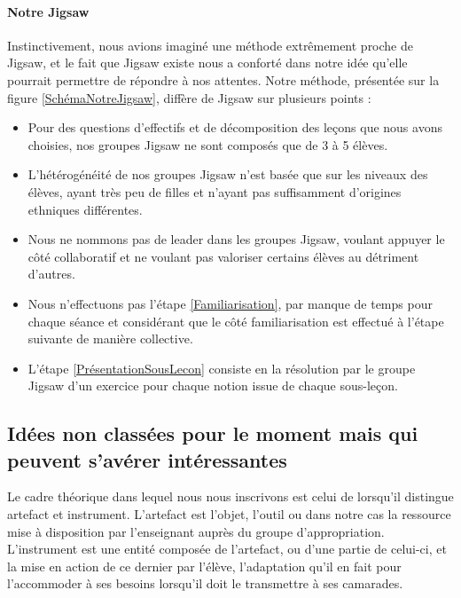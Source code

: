 \paragraph{Notre Jigsaw}
Instinctivement, nous avions imaginé une méthode extrêmement proche de Jigsaw, et le fait que Jigsaw existe nous a conforté dans notre idée qu'elle pourrait permettre de répondre à nos attentes. Notre méthode, présentée sur la figure \ref{SchémaNotreJigsaw}, diffère de Jigsaw sur plusieurs points :
\begin{itemize}
	\item Pour des questions d'effectifs et de décomposition des leçons que nous avons choisies, nos groupes Jigsaw ne sont composés que de 3 à 5 élèves.
	\item L'hétérogénéité de nos groupes Jigsaw n'est basée que sur les niveaux des élèves, ayant très peu de filles et n'ayant pas suffisamment d'origines ethniques différentes.
	\item Nous ne nommons pas de leader dans les groupes Jigsaw, voulant appuyer le côté collaboratif et ne voulant pas valoriser certains élèves au détriment d'autres.
	\item Nous n'effectuons pas l'étape \ref{Familiarisation}, par manque de temps pour chaque séance et considérant que le côté familiarisation est effectué à l'étape suivante de manière collective.
	\item L'étape \ref{PrésentationSousLecon} consiste en la résolution par le groupe Jigsaw d'un exercice pour chaque notion issue de chaque sous-leçon.
\end{itemize}


\newpage

\fancyhfoffset[L]{3cm}



\subsection{Idées non classées pour le moment mais qui peuvent s'avérer intéressantes}


Le cadre théorique dans lequel nous nous inscrivons est celui de \cite{rabardel_les_1995} lorsqu'il distingue artefact et instrument. L'artefact est l'objet, l'outil ou dans notre cas la ressource mise à disposition par l'enseignant auprès du groupe d'appropriation. L'instrument est une entité composée de l'artefact, ou d'une partie de celui-ci, et la mise en action de ce dernier par l'élève, l'adaptation qu'il en fait pour l'accommoder à ses besoins lorsqu'il doit le transmettre à ses camarades.



